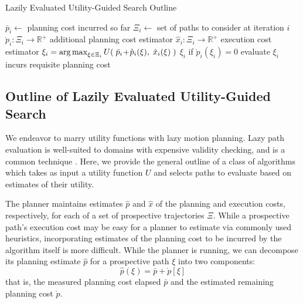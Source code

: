 \begin{algorithm}[t]
\caption{Lazily Evaluated Utility-Guided Search Outline}
\label{alg:utility-search-outline}
\begin{algorithmic}[1]
   \State $\bar{p}_i \leftarrow$
      planning cost incurred so far
   \State $\Xi_i \leftarrow$ set of paths to consider at iteration $i$
   \State $\grave{p}_i : \Xi_i \rightarrow \mathbb{R}^+$
      \Comment additional planning cost estimator
   \State $\hat{x}_i : \Xi_i \rightarrow \mathbb{R}^+$
      \Comment execution cost estimator
   \State $\xi_i = \operatorname*{arg\,max}_{\xi \in \Xi_i}
      U\!\left( \; \bar{p}_i \! + \! \grave{p}_i(\xi), \; \hat{x}_i(\xi) \; \right)$
      \label{line:outline-argmax}
   \State \Return $\xi_i$
      if $\grave{p}_i( \xi_i ) = 0$
   \State evaluate $\xi_i$
      \Comment incurs requisite planning cost
\EndFor
\end{algorithmic}
\end{algorithm}

\subsection{Outline of Lazily Evaluated Utility-Guided Search}

We endeavor to marry utility functions with lazy motion planning.
Lazy path evaluation is well-suited to domains with expensive
validity checking,
and is a common technique \citep{bohlin2000lazyprm, cohen2014narms}.
Here,
we provide the general outline of a class of algorithms which
takes as input a utility function $U$
and selects paths to evaluate based on estimates of their utility.

The planner maintains estimates $\hat{p}$ and $\hat{x}$
of the planning and execution costs, respectively,
for each of a set of prospective trajectories $\Xi$.
While a prospective path's execution cost may be easy for a planner
to estimate via commonly used heuristics,
incorporating estimates of the planning cost
to be incurred by the algorithm itself is more difficult.
While the planner is running,
we can decompose its planning estimate $\hat{p}$ for a prospective
path $\xi$ into two components:
\begin{equation}
   \hat{p}(\xi) = \bar{p} + \grave{p}[\xi]
\end{equation}
that is,
the measured planning cost elapsed $\bar{p}$
and the estimated remaining planning cost $\grave{p}$.

